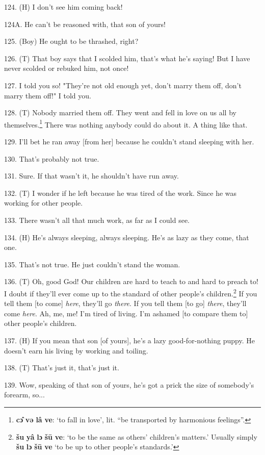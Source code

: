 124. (H) I don't see him coming back!

124A. He can't be reasoned with, that son of yours!

125. (Boy) He ought to be thrashed, right?

126. (T) That boy says that I scolded him, that's what he's saying! But I have
never scolded or rebuked him, not once!

127. I told you so! "They're not old enough yet, don't marry them off,
don't marry them off!" I told you.

128. (T) Nobody married them off. They went and fell in love on us all by themselves.\footnote{\textbf{cɔ̂} \textbf{və} \textbf{lâ} \textbf{ve}: `to fall in love', lit. ``be transported by harmonious feelings''.}
There was nothing anybody could do about it. A thing like that.

129. I'll bet he ran away [from her] because he couldn't stand sleeping with her.

130. That's probably not true.

131. Sure. If that wasn't it, he shouldn't have run away.

132. (T) I wonder if he left because he was tired of the work. Since he was working
for other people.

133. There wasn't all that much work, as far as I could see.

134. (H) He's always sleeping, always sleeping. He's as lazy as they come, that
one.

135. That's not true. He just couldn't stand the woman.

136. (T) Oh, good God! Our children are hard to teach to and hard to preach to!
I doubt if they'll ever come up to the standard of other people's children.\footnote{\textbf{šu} \textbf{yâ} \textbf{lɔ} \textbf{šū} \textbf{ve}: `to be the same as others' children's matters.' Usually simply \textbf{šu} \textbf{lɔ} \textbf{šū} \textbf{ve} `to be up to other people's standards.'}
If you tell them [to come] \textit{here}, they'll go \textit{there}. If you tell
them [to go] \textit{there}, they'll come \textit{here}. Ah, me, me! I'm tired
of living. I'm ashamed [to compare them to] other people's children.

137. (H) If you mean that son [of yours], he's a lazy good-for-nothing puppy. He
doesn't earn his living by working and toiling.

138. (T) That's just it, that's just it.

139. Wow, speaking of that son of yours, he's got a prick the size of somebody's
forearm, so...


